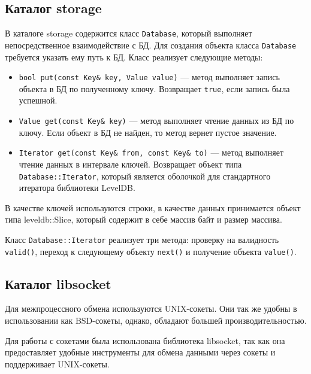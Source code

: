 \subsection{Каталог storage}
В каталоге storage содержится класс \texttt{Database}, который выполняет непосредственное взаимодействие с БД. Для создания объекта класса \texttt{Database} требуется указать ему путь к БД. Класс реализует следующие методы:
\begin{itemize}
\item \texttt{bool put(const Key\& key, Value value)} --- метод выполняет запись объекта в БД по полученному ключу. Возвращает \texttt{true}, если запись была успешной.
\item \texttt{Value get(const Key\& key)} --- метод выполняет чтение данных из БД по ключу. Если объект в БД не найден, то метод вернет пустое значение.
\item \texttt{Iterator get(const Key\& from, const Key\& to)} --- метод выполняет чтение данных в интервале ключей. Возвращает объект типа \texttt{Database::Iterator}, который является оболочкой для стандартного итератора библиотеки LevelDB.
\end{itemize}

В качестве ключей используются строки, в качестве данных принимается объект типа leveldb::Slice, который содержит в себе массив байт и размер массива. 

Класс \texttt{Database::Iterator} реализует три метода: проверку на валидность \texttt{valid()}, переход к следующему объекту \texttt{next()} и получение объекта \texttt{value()}.

\subsection{Каталог libsocket}
Для межпроцессного обмена используются UNIX-сокеты. Они так же удобны в использовании как BSD-сокеты, однако, обладают большей производительностью.

Для работы с сокетами была использована библиотека libsocket\cite{libsocket}, так как она предоставляет удобные инструменты для обмена данными через сокеты и поддерживает UNIX-сокеты.

